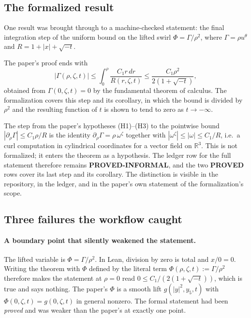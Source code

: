 \documentclass[11pt]{article}
\newcommand{\Lean}{Lean}
\newcommand{\R}{\mathbb{R}}
\newcommand{\claim}[1]{\textbf{#1}}
\begin{document}
\subsection{The formalized result}

One result was brought through to a machine-checked statement: the final
integration step of the uniform bound on the lifted swirl $\Phi = \Gamma/\rho^2$,
where $\Gamma = \rho u^\theta$ and $R = 1+|x|+\sqrt{-t}$.

The paper's proof ends with
\begin{equation}
|\Gamma(\rho,\zeta,t)| \le \int_0^\rho \frac{C_1 r \, dr}{R(r,\zeta,t)}
\le \frac{C_1 \rho^2}{2(1+\sqrt{-t})},
\end{equation}
obtained from $\Gamma(0,\zeta,t)=0$ by the fundamental theorem of calculus.
The formalization covers this step and its corollary, in which the bound is
divided by $\rho^2$ and the resulting function of $t$ is shown to tend to zero
as $t \to -\infty$.

The step from the paper's hypotheses (H1)--(H3) to the pointwise bound
$|\partial_\rho \Gamma| \le C_1\rho/R$ is the identity
$\partial_\rho \Gamma = \rho\,\omega^\zeta$ together with $|\omega^\zeta| \le
|\omega| \le C_1/R$, i.e.\ a curl computation in cylindrical coordinates for a
vector field on $\R^3$. This is not formalized; it enters the theorem as a
hypothesis. The ledger row for the full statement therefore remains
\claim{PROVED-INFORMAL}, and the two \claim{PROVED} rows cover its last step
and its corollary. The distinction is visible in the repository, in the ledger,
and in the paper's own statement of the formalization's scope.

\subsection{Three failures the workflow caught}

\paragraph{A boundary point that silently weakened the statement.}
The lifted variable is $\Phi = \Gamma/\rho^2$. In \Lean, division by zero is
total and $x/0 = 0$. Writing the theorem with $\Phi$ defined by the literal term
$\Phi(\rho,\zeta,t) := \Gamma/\rho^2$ therefore makes the statement at
$\rho = 0$ read $0 \le C_1/(2(1+\sqrt{-t}))$, which is true and says nothing. The paper's $\Phi$ is a smooth lift $g(|y|^2,y_5,t)$ with
$\Phi(0,\zeta,t) = g(0,\zeta,t)$ in general nonzero. The formal statement had
been \emph{proved} and was weaker than the paper's at exactly one point.
\end{document}

